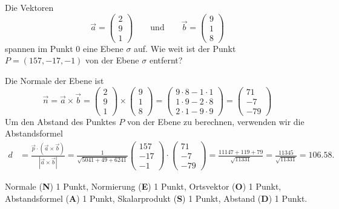 Die Vektoren
\[
\vec a
=
\begin{pmatrix}2\\9\\1\end{pmatrix}
\qquad
\text{und}
\qquad
\vec b
=
\begin{pmatrix}9\\1\\8\end{pmatrix}
\]
spannen im Punkt $0$ eine Ebene $\sigma$ auf. Wie weit ist der Punkt
$P=(157,-17,-1)$ von der Ebene $\sigma$ entfernt?

\begin{loesung}
Die Normale der Ebene ist
\[
\vec n=
\vec a\times\vec b
=
\begin{pmatrix}2\\9\\1\end{pmatrix}
\times
\begin{pmatrix}9\\1\\8\end{pmatrix}
=
\begin{pmatrix}
9\cdot 8-1\cdot 1\\
1\cdot 9-2\cdot 8\\
2\cdot 1-9\cdot 9
\end{pmatrix}
=
\begin{pmatrix}
71\\-7\\-79
\end{pmatrix}
\]
Um den Abstand des Punktes $P$ von der Ebene zu berechnen, verwenden
wir die Abstandsformel
\begin{align*}
d&=\frac{\vec p\cdot (\vec a\times\vec b)}{|\vec a\times\vec b|}
=\frac1{\sqrt{5041+49+6241}}\begin{pmatrix}157\\-17\\-1\end{pmatrix}\cdot
\begin{pmatrix}
71\\-7\\-79
\end{pmatrix}
=\frac{11147+119+79}{\sqrt{11331}}=\frac{11345}{\sqrt{11331}}=106.58.
\end{align*}
\end{loesung}

\begin{bewertung}
Normale (\textbf{N}) 1 Punkt, Normierung (\textbf{E}) 1 Punkt, 
Ortsvektor (\textbf{O}) 1 Punkt,
Abstandsformel (\textbf{A}) 1 Punkt, Skalarprodukt (\textbf{S}) 1 Punkt,
Abstand (\textbf{D}) 1 Punkt.
\end{bewertung}
